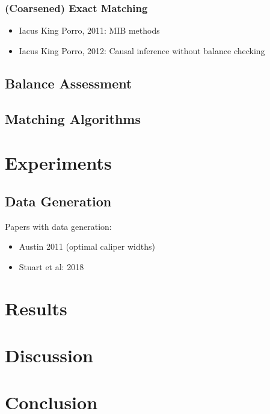 \documentclass[11pt]{extarticle}
\begin{document}
\subsubsection{(Coarsened) Exact Matching}

\begin{itemize}
  \item Iacus King Porro, 2011: MIB methods
  \item Iacus King Porro, 2012: Causal inference without balance checking
\end{itemize}

\subsection{Balance Assessment}

\subsection{Matching Algorithms}

\section{Experiments}

\subsection{Data Generation}

Papers with data generation:
\begin{itemize}
  \item Austin 2011 (optimal caliper widths)
  \item Stuart et al: 2018
\end{itemize}

\section{Results}

\section{Discussion}

\section{Conclusion}
\end{document}
